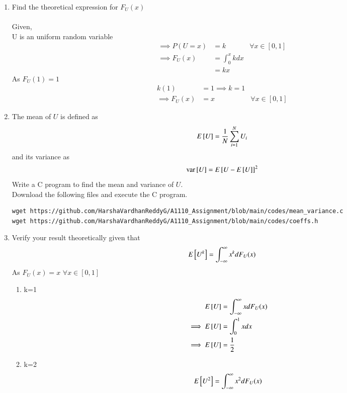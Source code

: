 \documentclass[journal,12pt,twocolumn]{IEEEtran}
\renewcommand\thesection{\arabic{section}}
\begin{document}
\begin{enumerate}[label=\thesection.\arabic*
,ref=\thesection.\theenumi]
\item Find the theoretical expression for $F_U(x)$ \\
\solution\\
Given,\\
U is an uniform random variable
\begin{align}
    \implies P(U=x) &= k & \forall x \in [0,1]\\
    \implies F_U(x) &= \int_0^x k dx\\
    &=kx
\end{align}
As $F_U(1)=1$
\begin{align}
    k(1)&=1\implies k=1\\
    \implies F_U(x)&=x &\forall x \in [0,1] \label{eq1}
\end{align}
\item
The mean of $U$ is defined as
%
\begin{equation}
E{}\left[U\right] = \frac{1}{N}\sum_{i=1}^{N}U_i
\end{equation}
%
and its variance as
%
\begin{equation}
\text{var}{}\left[U\right] = E{}\left[U- E{}\left[U\right]\right]^2 
\end{equation}
Write a C program to  find the mean and variance of $U$. \\
\solution Download the following files and execute the  C program.
\begin{lstlisting}
wget https://github.com/HarshaVardhanReddyG/A1110_Assignment/blob/main/codes/mean_variance.c
wget https://github.com/HarshaVardhanReddyG/A1110_Assignment/blob/main/codes/coeffs.h
\end{lstlisting}
\item Verify your result theoretically given that
\begin{equation}
E{}\left[U^k\right] = \int_{-\infty}^{\infty}x^kdF_{U}(x)
\end{equation}
\solution 
As $F_U(x) = x$ $\forall x \in [0,1]$
\begin{enumerate}
    \item k=1
    \begin{align}
        E{}\left[U\right] &= \int_{-\infty}^{\infty}xdF_{U}(x)\\
        \implies E{}\left[U\right] &= \int_{0}^{1}xdx\\
        \implies E{}\left[U\right] &=\frac{1}{2}
    \end{align}
    \item k=2
    \begin{align}
        E\sbrak{U^2} &= \int_{-\infty}^{\infty}x^2dF_{U}(x)\\

\end{align}
\end{enumerate}
\end{enumerate}
\end{document}
